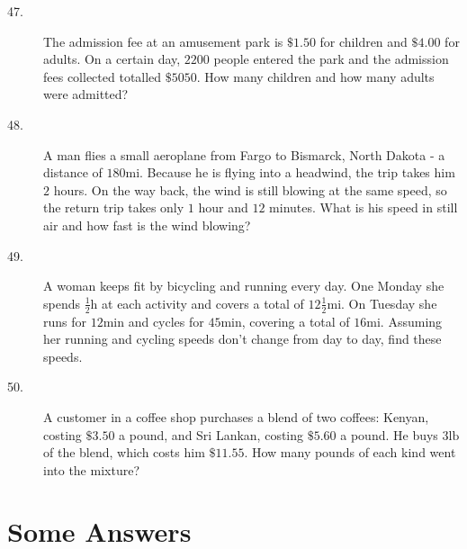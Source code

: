 \begin{description}
	\item [47.] The admission fee at an amusement park is $ \$1.50$ for children and $ \$4.00$ for adults. On a certain day, $2200$ people entered the park and the admission fees collected totalled $ \$5050$. How many children and how many adults were admitted? 
	
	\item [48.]
	A man flies a small aeroplane from Fargo to Bismarck, North Dakota - a distance of $180 \mbox{mi}$. Because he is flying into a headwind, the trip
	takes him $2$ hours. On the way back, the wind is still blowing at the same speed, so the return
	trip takes only $1$ hour and $12$ minutes. What is his speed in still air and how fast is the wind blowing? 
	
	\item [49.]
	A woman keeps fit by bicycling and running every day. One Monday she spends $\frac{1}{2} \mbox{h}$ at each activity and covers a total of $12\frac{1}{2} \mbox{mi}$. On Tuesday she runs for $12 \mbox{min}$ and cycles for $45 \mbox{min}$, covering a total of $16 \mbox{mi}$. Assuming her running and cycling speeds don't
	change from day to day, find these speeds. 
	
	\item [50.] A customer
	in a coffee shop purchases a blend of two coffees: Kenyan, costing $ \$3.50$ a pound, and Sri Lankan, costing $ \$5.60$ a pound. He buys $3 \mbox{lb}$ of the blend, which costs him $ \$11.55$. How many pounds of each kind went into the mixture?
\end{description}


\section{Some Answers}

